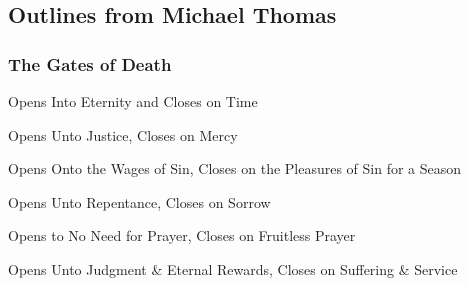 \subsection{Outlines from Michael Thomas}


\subsubsection{The Gates of Death}



\begin{compactenum}[I.][6]
	\item Opens Into Eternity and Closes on Time
	\item Opens Unto Justice, Closes on Mercy
	\item Opens Onto the Wages of Sin, Closes on the Pleasures of Sin for a Season
	\item Opens Unto Repentance, Closes on Sorrow
	\item Opens to No Need for Prayer, Closes on Fruitless Prayer
	\item Opens Unto Judgment \& Eternal Rewards, Closes on Suffering \& Service
\end{compactenum}

